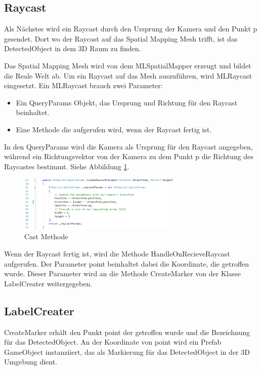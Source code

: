 \documentclass[german,a4paper, 12pt]{llncs}
\begin{document}
\subsection{Raycast}

Als Nächstes wird ein Raycast durch den Ursprung der Kamera und den Punkt p gesendet. Dort wo der Raycast auf das Spatial Mapping Mesh trifft, ist das DetectedObject in dem 3D Raum zu finden. 

Das Spatial Mapping Mesh wird von dem MLSpatialMapper erzeugt und bildet die Reale Welt ab. Um ein Raycast auf das Mesh auszuführen, wird MLRaycast eingesetzt. Ein MLRaycast brauch zwei Parameter:
\begin{itemize}
	\item Ein QueryParams Objekt, das Ursprung und Richtung für den Raycast beinhaltet.
	\item Eine Methode die aufgerufen wird, wenn der Raycast fertig ist. 
\end{itemize}
In den QueryParams wird die Kamera als Ursprung für den Raycast angegeben, während ein Richtungsvektor von der Kamera zu dem Punkt p die Richtung des Raycastes bestimmt. Siehe Abbildung \ref{code:raycastparams}.

\begin{figure}[H]
	\centering
	\includegraphics[width=0.7\textwidth]{images/code_raycastparams.PNG}
	\caption[]{Cast Methode}
	\label{code:raycastparams}
\end{figure}

Wenn der Raycast fertig ist, wird die Methode HandleOnRecieveRaycast aufgerufen. Der Parameter point beinhaltet dabei die Koordinate, die getroffen wurde.
Dieser Parameter wird an die Methode CreateMarker von der Klasse LabelCreater weitergegeben.

\subsection{LabelCreater}

CreateMarker erhält den Punkt point der getroffen wurde und die Bezeichnung für das DetectedObject. An der Koordinate von point wird ein Prefab GameObject instanziiert, das als Markierung für das DetectedObject in der 3D Umgebung dient.
\end{document}

